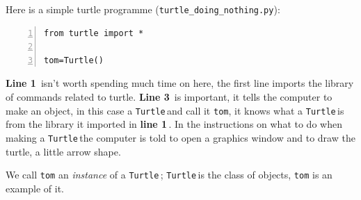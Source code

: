 \documentclass[11pt,a4paper]{scrartcl}
\newcommand{\turtle}{\texttt{Turtle}\,}
\newcommand{\lnn}[1]{\textbf{line #1}\,}
\newcommand{\Lnn}[1]{\textbf{Line #1}\,}
\begin{document}
Here is a simple turtle programme (\texttt{turtle\_doing\_nothing.py}):
\begin{lstlisting}[numbers=left]
from turtle import *

tom=Turtle()

\end{lstlisting}
\Lnn{1} isn't worth spending much time on here, the first line imports
the library of commands related to turtle. \Lnn{3} is important, it
tells the computer to make an object, in this case a \turtle and call
it \texttt{tom}, it knows what a \turtle is from the library it
imported in \lnn{1}. In the instructions on what to do when making a
\turtle the computer is told to open a graphics window and to draw the
turtle, a little arrow shape.
\begin{center}
\end{center}
We call \texttt{tom} an \textsl{instance} of a \turtle; \turtle is the class of
objects, \texttt{tom} is an example of it.
\end{document}
